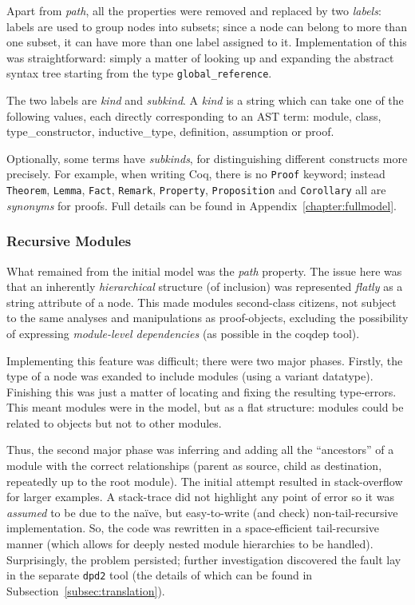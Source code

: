 Apart from \emph{path}, all the properties were removed and replaced by two
\emph{labels}: labels are used to group  nodes into subsets; since a node can
belong to more than one subset, it can have more than one label assigned to it.
Implementation of this was straightforward: simply a matter of looking up and
expanding the abstract syntax tree starting from the type
\texttt{global\_reference}.

The two labels are \emph{kind} and \emph{subkind}.  A \emph{kind} is a string
which can take one of the following values, each directly corresponding to an
AST term: \textsf{module}, \textsf{class}, \textsf{type\_constructor},
\textsf{inductive\_type}, \textsf{definition}, \textsf{assumption} or
\textsf{proof}.

Optionally, some terms have \emph{subkinds}, for distinguishing different
constructs more precisely. For example, when writing Coq, there is no
\texttt{Proof} keyword; instead \texttt{Theorem}, \texttt{Lemma}, \texttt{Fact},
\texttt{Remark}, \texttt{Property}, \texttt{Proposition} and \texttt{Corollary}
all are \emph{synonyms} for proofs. Full details can be found in
Appendix~\ref{chapter:fullmodel}.

\subsubsection{Recursive Modules}

What remained from the initial model was the \emph{path} property. The issue
here was that an inherently \emph{hierarchical} structure (of inclusion) was
represented \emph{flatly} as a string attribute of a node. This made modules
second-class citizens, not subject to the same analyses and manipulations as
proof-objects, excluding the possibility of expressing \emph{module-level
dependencies} (as possible in the coqdep tool).

Implementing this feature was difficult; there were two major phases. Firstly,
the type of a node was exanded to include modules (using a variant datatype).
Finishing this was just a matter of locating and fixing the resulting
type-errors. This meant modules were in the model, but as a flat structure:
modules could be related to objects but not to other modules.

Thus, the second major phase was inferring and adding all the ``ancestors'' of
a module with the correct relationships (parent as source, child as
destination, repeatedly up to the root module). The initial attempt resulted in
stack-overflow for larger examples. A stack-trace did not highlight any point
of error so it was \emph{assumed} to be due to the na\"{i}ve, but easy-to-write
(and check) non-tail-recursive implementation. So, the code was rewritten in a
space-efficient tail-recursive manner (which allows for deeply nested module
hierarchies to be handled). Surprisingly, the problem persisted; further
investigation discovered the fault lay in the separate \texttt{dpd2} tool (the
details of which can be found in Subsection~\ref{subsec:translation}).

